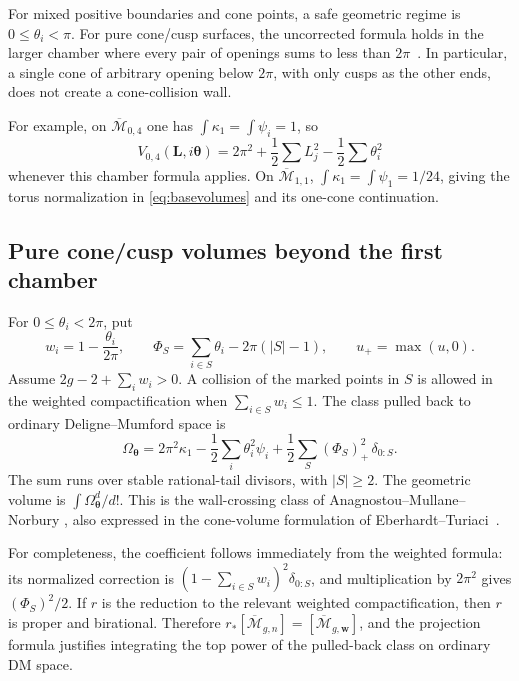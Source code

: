 \documentclass[11pt,a4paper]{article}
\numberwithin{equation}{section}
\theoremstyle{definition}
\theoremstyle{remark}
\newcommand{\MM}{\overline{\mathcal M}}
\newcommand{\angles}{\boldsymbol\theta}
\newcommand{\lengths}{\mathbf L}
\begin{document}
For mixed positive boundaries and cone points, a safe geometric regime is
$0\le\theta_i<\pi$. For pure cone/cusp surfaces, the uncorrected formula
holds in the larger chamber where every pair of openings sums to less than
$2\pi$~\cite{AnagnostouNorbury}. In particular, a single cone of arbitrary
opening below $2\pi$, with only cusps as the other ends, does not create a
cone-collision wall.

For example, on $\MM_{0,4}$ one has
$\int\kappa_1=\int\psi_i=1$, so
\begin{equation}
 V_{0,4}(\lengths,i\angles)
 =2\pi^2+\frac12\sum L_j^2-\frac12\sum\theta_i^2
 \label{eq:mixedv04}
\end{equation}
whenever this chamber formula applies. On $\MM_{1,1}$,
$\int\kappa_1=\int\psi_1=1/24$, giving the torus normalization in
\eqref{eq:basevolumes} and its one-cone continuation.

\subsection{Pure cone/cusp volumes beyond the first chamber}

For $0\le\theta_i<2\pi$, put
\[
 w_i=1-\frac{\theta_i}{2\pi},\qquad
 \Phi_S=\sum_{i\in S}\theta_i-2\pi(|S|-1),\qquad u_+=\max(u,0).
\]
Assume $2g-2+\sum_iw_i>0$. A collision of the marked points in $S$ is
allowed in the weighted compactification when $\sum_{i\in S}w_i\le1$.
The class pulled back to ordinary Deligne--Mumford space is
\begin{equation}
 \boxed{
 \Omega_{\angles}=2\pi^2\kappa_1-\frac12\sum_i\theta_i^2\psi_i
      +\frac12\sum_S(\Phi_S)_+^2\,\delta_{0:S}.}
 \label{eq:wallclass}
\end{equation}
The sum runs over stable rational-tail divisors, with $|S|\ge2$. The
geometric volume is $\int\Omega_{\angles}^{d}/d!$. This is the
wall-crossing class of Anagnostou--Mullane--Norbury
\cite[Definitions 2.12--2.13 and Lemma 2.14]{AMN}, also expressed in the
cone-volume formulation of Eberhardt--Turiaci~\cite{ET}.

For completeness, the coefficient follows immediately from the weighted
formula: its normalized correction is
$(1-\sum_{i\in S}w_i)^2\delta_{0:S}$, and multiplication by $2\pi^2$
gives $(\Phi_S)^2/2$. If $r$ is the reduction to the relevant weighted
compactification, then $r$ is proper and birational. Therefore
$r_*[\MM_{g,n}]=[\MM_{g,\mathbf w}]$, and the projection formula justifies
integrating the top power of the pulled-back class on ordinary DM space.
\end{document}
